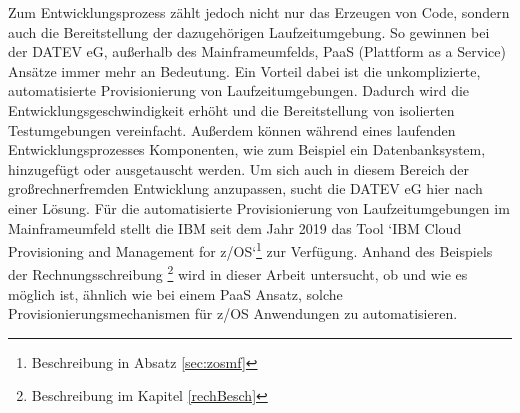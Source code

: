 Zum Entwicklungsprozess zählt jedoch nicht nur das Erzeugen von Code, sondern auch die Bereitstellung der dazugehörigen Laufzeitumgebung.
So gewinnen bei der DATEV eG, außerhalb des Mainframeumfelds, PaaS (Plattform as a Service) Ansätze immer mehr an Bedeutung.
Ein Vorteil dabei ist die unkomplizierte, automatisierte Provisionierung von Laufzeitumgebungen.
Dadurch wird die Entwicklungsgeschwindigkeit erhöht und die Bereitstellung von isolierten Testumgebungen vereinfacht.
Außerdem können während eines laufenden Entwicklungsprozesses Komponenten, wie zum Beispiel ein Datenbanksystem, hinzugefügt oder ausgetauscht werden.
Um sich auch in diesem Bereich der großrechnerfremden Entwicklung anzupassen, sucht die DATEV eG hier nach einer Lösung.
Für die automatisierte Provisionierung von Laufzeitumgebungen im Mainframeumfeld stellt die IBM seit dem Jahr 2019 das Tool `IBM Cloud Provisioning and Management for z/OS`\footnote{Beschreibung in Absatz \ref{sec:zosmf}} zur Verfügung.
Anhand des Beispiels der Rechnungsschreibung \footnote{Beschreibung im Kapitel \ref{rechBesch}} wird in dieser Arbeit untersucht, ob und wie es möglich ist, ähnlich wie bei einem PaaS Ansatz, solche Provisionierungsmechanismen für z/OS Anwendungen zu automatisieren.
